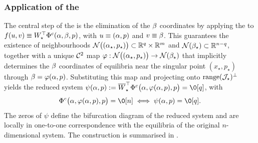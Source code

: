 \documentclass[a4paper]{cas-dc}
\begin{document}
\subsubsection*{Application of the \ImFT{}}

The central step of the \LSR{} is the elimination of the \(\B\) coordinates by applying the \ImFT{} to \(f(u,v) \equiv \W^{\top}\Phi^{c}(\A,\B,p)\), with \(u \equiv (\A,p)\) and \(v \equiv \B\). This guarantees the existence of neighbourhoods \(\mathcal{N}\bigl((\A_{\star},p_{\star})\bigr) \subset \R[q] \times \R[m]\) and \(\mathcal{N}(\B_{\star}) \subset \R[n-q]\), together with a unique \(\C[2]\) map \(\varphi : \mathcal{N}\bigl((\A_{\star},p_{\star})\bigr) \to \mathcal{N}(\B_{\star})\) that implicitly determines the \(\B\) coordinates of equilibria near the singular point \((x_{\star},p_{\star})\) through \(\B = \varphi(\A,p)\). Substituting this map and projecting onto \(\range(\J)^{\perp}\) yields the reduced system \(\psi(\A,p) := \Wbar^{\top}\Phi^{c}\bigl(\A,\varphi(\A,p),p\bigr) = \0[q]\), with
\begin{equation}
    \Phi^{c}\bigl(\A,\varphi(\A,p),p\bigr) = \0[n] \iff \psi(\A,p) = \0[q].
    \label{eq:LSRmap}
\end{equation}
The zeros of \(\psi\) define the bifurcation diagram of the reduced system and are locally in one-to-one correspondence with the equilibria of the original \(n\)-dimensional system. The construction is summarised in .
\end{document}
